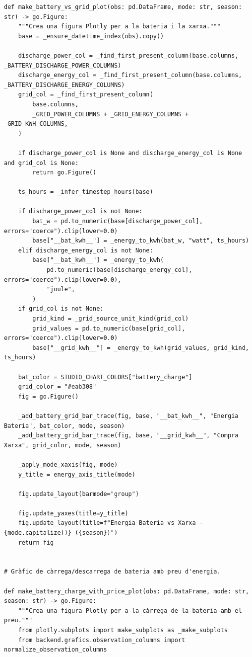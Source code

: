 \documentclass[10pt,a4paper]{article}
\begin{document}
\begin{lstlisting}[style=studioPython,caption={backend/grafics/battery.py},label={lst:backend-grafics-battery-py}]
def make_battery_vs_grid_plot(obs: pd.DataFrame, mode: str, season: str) -> go.Figure:
    """Crea una figura Plotly per a la bateria i la xarxa."""
    base = _ensure_datetime_index(obs).copy()

    discharge_power_col = _find_first_present_column(base.columns, _BATTERY_DISCHARGE_POWER_COLUMNS)
    discharge_energy_col = _find_first_present_column(base.columns, _BATTERY_DISCHARGE_ENERGY_COLUMNS)
    grid_col = _find_first_present_column(
        base.columns,
        _GRID_POWER_COLUMNS + _GRID_ENERGY_COLUMNS + _GRID_KWH_COLUMNS,
    )

    if discharge_power_col is None and discharge_energy_col is None and grid_col is None:
        return go.Figure()

    ts_hours = _infer_timestep_hours(base)

    if discharge_power_col is not None:
        bat_w = pd.to_numeric(base[discharge_power_col], errors="coerce").clip(lower=0.0)
        base["__bat_kwh__"] = _energy_to_kwh(bat_w, "watt", ts_hours)
    elif discharge_energy_col is not None:
        base["__bat_kwh__"] = _energy_to_kwh(
            pd.to_numeric(base[discharge_energy_col], errors="coerce").clip(lower=0.0),
            "joule",
        )
    if grid_col is not None:
        grid_kind = _grid_source_unit_kind(grid_col)
        grid_values = pd.to_numeric(base[grid_col], errors="coerce").clip(lower=0.0)
        base["__grid_kwh__"] = _energy_to_kwh(grid_values, grid_kind, ts_hours)

    bat_color = STUDIO_CHART_COLORS["battery_charge"]
    grid_color = "#eab308"
    fig = go.Figure()

    _add_battery_grid_bar_trace(fig, base, "__bat_kwh__", "Energia Bateria", bat_color, mode, season)
    _add_battery_grid_bar_trace(fig, base, "__grid_kwh__", "Compra Xarxa", grid_color, mode, season)

    _apply_mode_xaxis(fig, mode)
    y_title = energy_axis_title(mode)

    fig.update_layout(barmode="group")

    fig.update_yaxes(title=y_title)
    fig.update_layout(title=f"Energia Bateria vs Xarxa - {mode.capitalize()} ({season})")
    return fig


# Gràfic de càrrega/descarrega de bateria amb preu d'energia.

def make_battery_charge_with_price_plot(obs: pd.DataFrame, mode: str, season: str) -> go.Figure:
    """Crea una figura Plotly per a la càrrega de la bateria amb el preu."""
    from plotly.subplots import make_subplots as _make_subplots
    from backend.grafics.observation_columns import normalize_observation_columns


\end{lstlisting}
\end{document}
